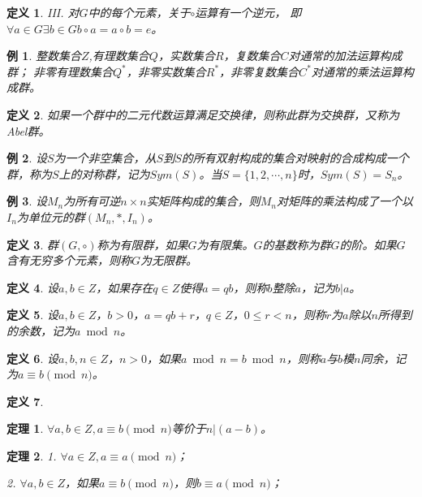 \documentclass{article}
\newtheorem{Def}{定义}
\newtheorem{Thm}{定理}
\newtheorem*{Example}{例}
\begin{document}
\begin{CJK*}{UTF8}{gbsn}
\begin{Def}
  III. 对$G$中的每个元素，关于$\circ$运算有一个逆元，
  即$\forall a\in G \exists b\in G b\circ a = a\circ b= e$。
\end{Def}
\begin{Example}
  整数集合$Z$,有理数集合$Q$，实数集合$R$，复数集合$C$对通常的加法运算构成群；
  非零有理数集合$Q^*$，非零实数集合$R^*$，非零复数集合$C^*$对通常的乘法运算构成群。
\end{Example}
\begin{Def}
  如果一个群中的二元代数运算满足交换律，则称此群为交换群，又称为Abel群。
\end{Def}
\begin{Example}
设$S$为一个非空集合，从$S$到$S$的所有双射构成的集合对映射的合成构成一个群，称为$S$上的对称群，记为$Sym(S)$。当$S=\{1,2,\cdots,n\}$时，$Sym(S)=S_n$。
\end{Example}
  \begin{Example}
    设$M_n$为所有可逆$n\times n$实矩阵构成的集合，则$M_n$对矩阵的乘法构成了一个以$I_n$为单位元的群$(M_n,*,I_n)$。
  \end{Example}
\begin{Def}
  群$(G,\circ)$称为有限群，如果$G$为有限集。$G$的基数称为群$G$的阶。如果$G$含有无穷多个元素，则称$G$为无限群。
\end{Def}

\begin{Def}
  设$a,b\in Z$，如果存在$q\in Z$使得$a=qb$，则称$b$整除$a$，记为$b|a$。
\end{Def}
\begin{Def}
  设$a,b\in Z$，$b>0$，$a=qb+r$，$q\in Z$，$0\leq r<n$，则称$r$为$a$除以$n$所得到的余数，记为$a\bmod n$。
\end{Def}

\begin{Def}
  设$a,b,n\in Z$，$n>0$，如果$a\bmod n=b\bmod n$，则称$a$与$b$模$n$同余，记为$a \equiv b\pmod{n}$。
\end{Def}

\begin{Def}

\end{Def}
\begin{Thm}
  $\forall a,b\in Z, a\equiv b\pmod{n}$等价于$n|(a-b)$。
\end{Thm}

\begin{Thm}
  1. $\forall a\in Z, a \equiv a \pmod{n}$；

  2. $\forall a, b\in Z$，如果$a\equiv b \pmod{n}$，则$b\equiv a\pmod{n}$；


\end{Thm}
\end{CJK*}
\end{document}
